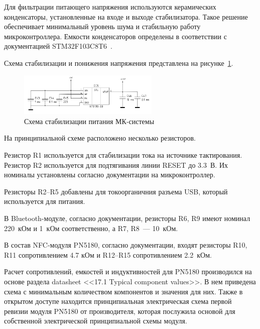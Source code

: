Для фильтрации питающего напряжения используются керамических конденсаторы, установленные на входе и выходе стабилизатора.
Такое решение обеспечивает минимальный уровень шума и стабильную работу микроконтроллера.
Емкости конденсаторов определены в соответствии с документацией STM32F103C8T6~\cite{stm32f103_datasheet}.

Схема стабилизации и понижения напряжения представлена на рисунке~\ref{fig:mk_usb_stab}.

\begin{figure}[H]
    \centering
    \includegraphics[width=0.6\textwidth]{images/design/mk_usb_stab}
    \caption{\centering Схема стабилизации питания МК-системы}
    \label{fig:mk_usb_stab}
\end{figure}


На принципиальной схеме расположено несколько резисторов.

Резистор R1 используется для стабилизации тока на источнике тактирования.
Резистор R2 используется для подтягивания линии RESET до 3.3~В.
Их номиналы установлены согласно документации на микроконтроллер\cite{stm32f103_datasheet}.

Резисторы R2--R5 добавлены для токоорганичния разъема USB, который используется для питания.

В Bluetooth-модуле, согласно документации, резисторы R6, R9 имеют номинал 220~кОм и 1~кОм соответственно, а R7, R8~--- 10~кОм.

В состав NFC-модуля PN5180, согласно документации, входят резисторы R10, R11 сопротивлением 4.7 кОм и R12--R15 сопротивлением 2.2~кОм.

Расчет сопротивлений, емкостей и индуктивностей для PN5180 производился на основе раздела datasheet <<17.1 Typical component values>>\cite{pn5180_datasheet}.
В нем приведена схема с минимальным количеством компонентов и значения для них.
Также в открытом доступе находится принципиальная электрическая схема первой ревизии модуля PN5180 от производителя, которая послужила основой для собственной электрической принципиальной схемы модуля\cite{pn5180_schematic}.

